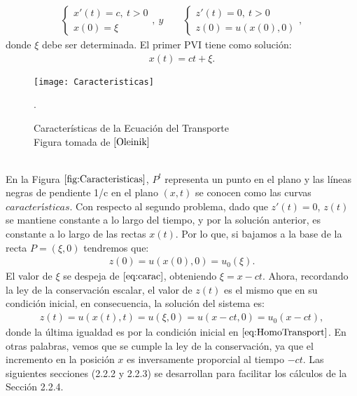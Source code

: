 \documentclass[12pt]{article}
\theoremstyle{definition}
\begin{document}
\begin{align*}
     \left\{ \begin{array}{ll}
         x'(t) = c , \:t > 0\\
         x(0) = \xi
         \end{array}
         \right.
         ,\:y
        \qquad
          \left \{ \begin{array}{ll}
         z'(t) = 0 , \:t > 0\\
         z(0) = u(x(0),0)
         \end{array}
         \right.
         ,
\end{align*}
donde $\xi$ debe ser determinada. El primer PVI tiene como solución:
\begin{align}
    x(t) = ct + \xi.
    \label{eq:carac}
\end{align}
\begin{figure}[h]
    \centering
    \texttt{[image: Caracteristicas]}
    \caption{Características de la Ecuación del Transporte \\
    Figura tomada de $\cite{Oleinik}$}.
    \label{fig:Caracteristicas}
\end{figure}
\\
En la Figura $\ref{fig:Caracteristicas}$, $P^{t}$ representa un punto en el plano y las líneas negras de pendiente 1/c en el plano $(x,t)$ se conocen como las curvas $\textit{características}$. Con respecto al segundo problema, dado que $z'(t)=0$, $z(t)$ se mantiene constante a lo largo del tiempo, y por la solución anterior, es constante a lo largo de las rectas $x(t)$. Por lo que, si bajamos a la base de la recta $P = (\xi,0)$ tendremos que:
\begin{align*}
    z(0) = u(x(0),0) = u_{0}(\xi).
\end{align*}
El valor de $\xi$ se despeja de $\eqref{eq:carac}$, obteniendo $\xi = x - ct$. Ahora, recordando la ley de la conservación escalar, el valor de $z(t)$ es el mismo que en su condición inicial, en consecuencia, la solución del sistema es:
\begin{align*}
    z(t) = u(x(t),t) = u(\xi,0) = u(x - ct,0) = u_{0}(x-ct),
\end{align*}
donde la última igualdad  es por la condición inicial en $\eqref{eq:HomoTransport}$. En otras palabras, vemos que se cumple la ley de la conservación, ya que el incremento en la posición $x$ es inversamente proporcial al tiempo $-ct$. Las siguientes secciones (2.2.2 y 2.2.3)  se desarrollan para facilitar los cálculos de la Sección 2.2.4.
\end{document}
